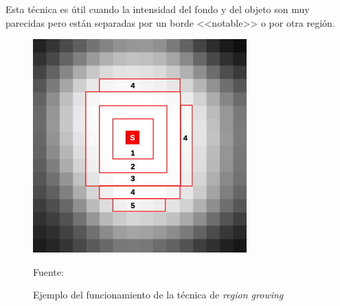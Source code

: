 Esta t\'{e}cnica es \'{u}til cuando la intensidad del fondo y del objeto son muy parecidas pero est\'{a}n separadas por un borde <<notable>> o por otra regi\'{o}n.
\begin{figure}[H]
	\captionsetup{justification=centering}
	\centering
	\includegraphics[width=.4\textwidth]{./imagenes/regionGrowing1}
	\caption{Ejemplo del funcionamiento de la t\'{e}cnica de \textit{region growing}}
	\vspace{2 mm}
	Fuente: \cite{eri2015}
	\label{regionGrowing1}
\end{figure}
\

\

\

